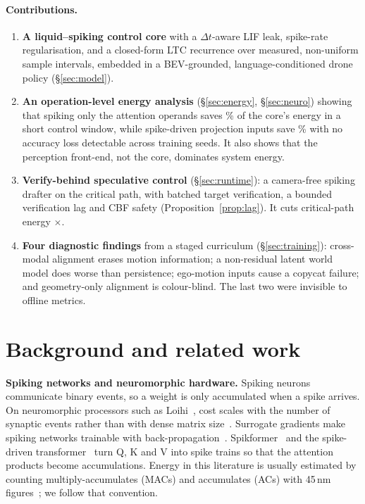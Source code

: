 \documentclass[12pt]{article}
\begin{document}
\paragraph{Contributions.}
\begin{enumerate}
\item \textbf{A liquid--spiking control core} with a $\Delta t$-aware LIF leak, spike-rate regularisation, and a closed-form LTC recurrence over measured, non-uniform sample intervals, embedded in a BEV-grounded, language-conditioned drone policy (\S\ref{sec:model}).
\item \textbf{An operation-level energy analysis} (\S\ref{sec:energy}, \S\ref{sec:neuro}) showing that spiking only the attention operands saves \nceSavingAsBuiltPct\% of the core's energy in a short control window, while spike-driven projection inputs save \nceSiSavingPct\% with no accuracy loss detectable across training seeds. It also shows that the perception front-end, not the core, dominates system energy.
\item \textbf{Verify-behind speculative control} (\S\ref{sec:runtime}): a camera-free spiking drafter on the critical path, with batched target verification, a bounded verification lag and CBF safety (Proposition~\ref{prop:lag}). It cuts critical-path energy \nceCritRatio$\times$.
\item \textbf{Four diagnostic findings} from a staged curriculum (\S\ref{sec:training}): cross-modal alignment erases motion information; a non-residual latent world model does worse than persistence; ego-motion inputs cause a copycat failure; and geometry-only alignment is colour-blind. The last two were invisible to offline metrics.
\end{enumerate}

\section{Background and related work}
\textbf{Spiking networks and neuromorphic hardware.} Spiking neurons communicate binary events, so a weight is only accumulated when a spike arrives. On neuromorphic processors such as Loihi~\citep{davies2018loihi}, cost scales with the number of synaptic events rather than with dense matrix size~\citep{roy2019towards}. Surrogate gradients make spiking networks trainable with back-propagation~\citep{neftci2019surrogate,zenke2018superspike}. Spikformer~\citep{zhou2023spikformer} and the spike-driven transformer~\citep{yao2023spikedriven} turn Q, K and V into spike trains so that the attention products become accumulations. Energy in this literature is usually estimated by counting multiply-accumulates (MACs) and accumulates (ACs) with 45\,nm figures~\citep{horowitz2014energy}; we follow that convention.
\end{document}
